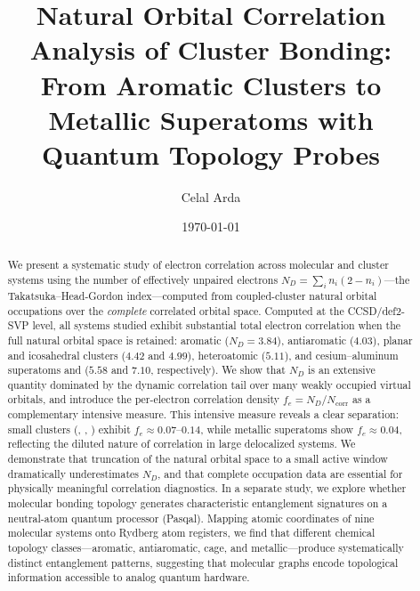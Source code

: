 \documentclass[12pt,a4paper]{article}
\title{%
  Natural Orbital Correlation Analysis of Cluster Bonding:\\
  From Aromatic Clusters to Metallic Superatoms with Quantum Topology Probes%
}
\author{Celal Arda \orcidlink{0009-0006-4563-8325}}
\affil{Independent Researcher}
\affil{\texttt{celal.arda@outlook.de}}
\date{\today}
\begin{document}
\maketitle

\begin{abstract}
We present a systematic study of electron correlation across molecular and
cluster systems using the number of effectively unpaired electrons
$N_D = \sum_i n_i(2 - n_i)$---the Takatsuka--Head-Gordon index---computed
from coupled-cluster natural orbital occupations over the \emph{complete}
correlated orbital space. Computed at the CCSD/def2-SVP level, all systems
studied exhibit substantial total electron correlation when the full natural
orbital space is retained: aromatic  ($N_D = 3.84$),
antiaromatic  ($4.03$), planar and icosahedral 
clusters ($4.42$ and $4.99$), heteroatomic  ($5.11$), and
cesium--aluminum superatoms  and 
($5.58$ and $7.10$, respectively). We show that $N_D$ is an
extensive quantity dominated by the dynamic correlation tail over many
weakly occupied virtual orbitals, and introduce the per-electron correlation
density $f_e = N_D/N_{\text{corr}}$ as a complementary intensive measure. This
intensive measure reveals a clear separation: small clusters
(, , ) exhibit $f_e \approx 0.07$--$0.14$, while
metallic superatoms show $f_e \approx 0.04$, reflecting the diluted
nature of correlation in large delocalized systems. We demonstrate that
truncation of the natural orbital space to a small active window
dramatically underestimates $N_D$, and that complete occupation data
are essential for physically meaningful correlation diagnostics.
In a separate study, we explore whether molecular bonding topology
generates characteristic entanglement signatures on a neutral-atom
quantum processor (Pasqal). Mapping atomic coordinates of nine
molecular systems onto Rydberg atom registers, we find that different
chemical topology classes---aromatic, antiaromatic, cage, and
metallic---produce systematically distinct entanglement patterns,
suggesting that molecular graphs encode topological information
accessible to analog quantum hardware.
\end{abstract}

\end{document}
